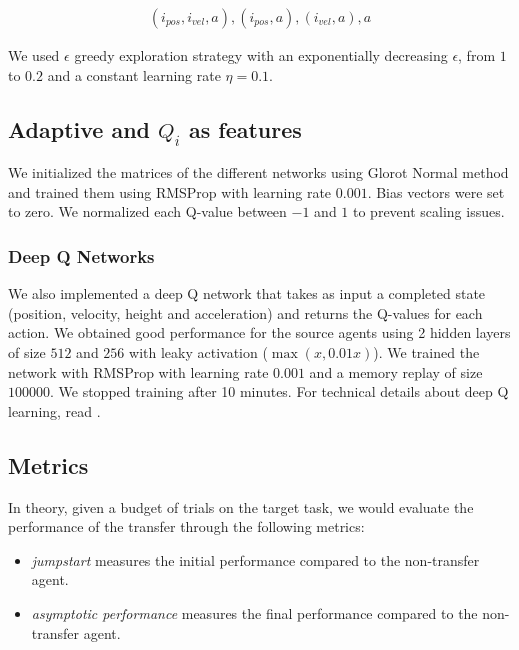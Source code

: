 \documentclass{article}
\newenvironment{myitemize}
{ \begin{itemize}
		\setlength{\itemsep}{0pt}
		\setlength{\parskip}{0pt}
		\setlength{\parsep}{0pt}     }
	{ \end{itemize}                  }
\begin{document}
\begin{align*}
(i_{pos}, i_{vel}, a), (i_{pos}, a), (i_{vel}, a), a
\end{align*}

We used $\epsilon$ greedy exploration strategy with an exponentially decreasing $\epsilon$, from $1$ to $0.2$ and a constant learning rate $\eta = 0.1$.

\subsection{Adaptive and $Q_i$ as features}
We initialized the matrices of the different networks using Glorot Normal method and trained them using RMSProp with learning rate $ 0.001 $. Bias vectors were set to zero. We normalized each Q-value between $-1$ and $1$ to prevent scaling issues.
\subsubsection{Deep Q Networks}

We also implemented a deep Q network that takes as input a completed state (position, velocity, height and acceleration) and returns the Q-values for each action. We obtained good performance for the source agents using 2 hidden layers of size $ 512 $ and $ 256 $ with leaky activation ($\max(x, 0.01 x) $). We trained the network with RMSProp with learning rate $ 0.001 $ and a memory replay of size $ 100 000 $. We stopped training after 10 minutes. For technical details about deep Q learning, read \cite{mnih2013playing}.
	
\subsection{Metrics}

In theory, given a budget of trials on the target task, we would evaluate the performance of the transfer through the following metrics:
\begin{myitemize}
\item \textit{jumpstart} measures the initial performance compared to the non-transfer agent.
\item \textit{asymptotic performance} measures the final performance compared to the non-transfer agent.
\end{myitemize}
\end{document}
